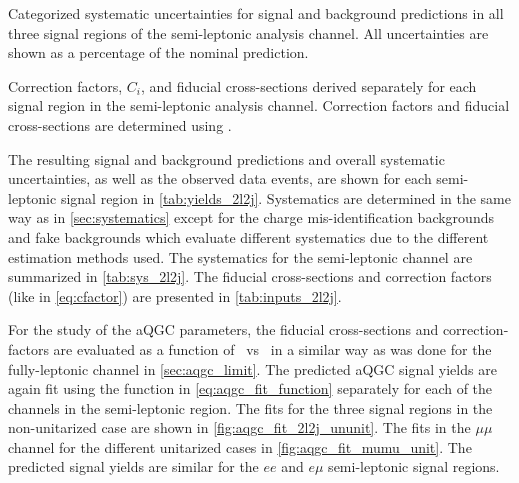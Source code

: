 \begin{table}[ht!]
\centering

\caption{Categorized systematic uncertainties 
for signal and background predictions in all three signal regions
of the semi-leptonic analysis channel.
All uncertainties are shown as a percentage of the nominal
prediction.  }
\label{tab:sys_2l2j}
\end{table}

\begin{table}[ht!]
\centering

\caption{Correction factors, $C_i$, and fiducial cross-sections derived
separately for each signal region in the semi-leptonic analysis channel. 
Correction factors and  fiducial cross-sections are determined
using \madgraph.}
\label{tab:inputs_2l2j}
\end{table}

The resulting signal and background predictions and overall systematic uncertainties,
as well as the observed data events,
are shown for each semi-leptonic signal region in \tab\ref{tab:yields_2l2j}. Systematics
are determined in the same way as in \sec\ref{sec:systematics} except for the charge
mis-identification backgrounds and fake backgrounds which evaluate different systematics due
to the different estimation methods used. The systematics for the semi-leptonic
channel are summarized in \tab\ref{tab:sys_2l2j}. The fiducial cross-sections
and correction factors (like in \eqn\eqref{eq:cfactor}) are presented in \tab\ref{tab:inputs_2l2j}.

For the study of the aQGC parameters, the fiducial cross-sections
and correction-factors are evaluated as a function of 
\fszero~vs \fsone~in a similar way as was done for the fully-leptonic
channel in \sec\ref{sec:aqgc_limit}.
The predicted aQGC signal yields are again fit using the function in 
\eqn\eqref{eq:aqgc_fit_function} separately for each of the channels in the semi-leptonic region.
The fits for the three signal regions in the non-unitarized case are shown in 
\fig\ref{fig:aqgc_fit_2l2j_ununit}. The fits in the $\mu\mu$ channel for the different
unitarized cases in \fig\ref{fig:aqgc_fit_mumu_unit}. The predicted signal yields
are similar for the $ee$ and $e\mu$ semi-leptonic signal regions. 



